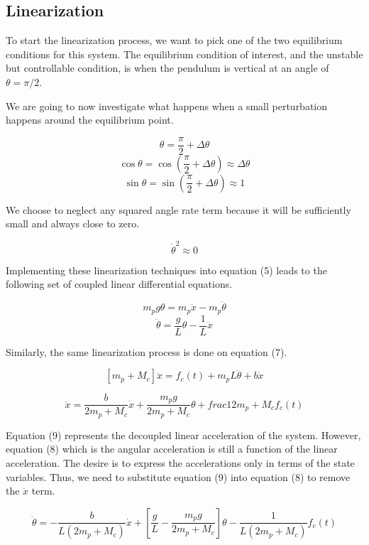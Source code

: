 \documentclass[titlepage]{article}
\begin{document}
\subsection{Linearization}

To start the linearization process, we want to pick one of the two equilibrium conditions for this system. The equilibrium condition of interest, and the unstable but controllable condition, is when the pendulum is vertical at an angle of \(\theta = \pi / 2\).

We are going to now investigate what happens when a small perturbation happens around the equilibrium point.

\[\theta = \frac{\pi}{2} + \Delta\theta\]
\[\cos{\theta} = \cos{\left(\frac{\pi}{2} + \Delta\theta\right)} \approx \Delta\theta\]
\[\sin{\theta} = \sin{\left(\frac{\pi}{2} + \Delta\theta\right)} \approx 1\]

We choose to neglect any squared angle rate term because it will be sufficiently small and always close to zero.

\[\dot{\theta}^{2} \approx 0\]

Implementing these linearization techniques into equation (5) leads to the following set of coupled linear differential equations.

\[m_{p}g\theta = m_{p}\ddot{x} - m_{p}\ddot{\theta}\]
\begin{equation}
\ddot{\theta} = \frac{g}{L}\theta - \frac{1}{L}\ddot{x}
\end{equation}

Similarly, the same linearization process is done on equation (7).

\[\left[m_{p} + M_{c}\right] \ddot{x} = f_{c}\left(t\right) + m_{p}L\ddot{\theta} + b\dot{x}\]

\begin{equation}
\ddot{x} = \frac{b}{2m_{p} + M_{c}}\dot{x} + \frac{m_{p}g}{2m_{p} + M_{c}}\theta + frac{1}{2m_{p} + M_{c}}f_{c}\left(t\right)
\end{equation}

Equation (9) represents the decoupled linear acceleration of the system. However, equation (8) which is the angular acceleration is still a function of the linear acceleration.
The desire is to express the accelerations only in terms of the state variables. Thus, we need to substitute equation (9) into equation (8) to remove the \(\ddot{x}\) term.

\begin{equation}
\ddot{\theta} = -\frac{b}{L\left(2m_{p} + M_{c}\right)}\dot{x} + \left[\frac{g}{L} - \frac{m_{p}g}{2m_{p} + M_{c}}\right]\theta - \frac{1}{L\left(2m_{p} + M_{c}\right)}f_{c}\left(t\right)
\end{equation}
\end{document}
